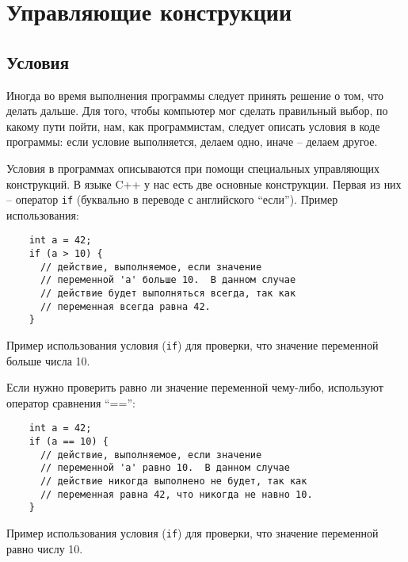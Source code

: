 \documentclass[../sparc.tex]{subfiles}
\begin{document}
\section{Управляющие конструкции}

\subsection{Условия}

Иногда во время выполнения программы следует принять решение о том, что делать
дальше.  Для того, чтобы компьютер мог сделать правильный выбор, по какому пути
пойти, нам, как программистам, следует описать условия в коде программы: если
условие выполняется, делаем одно, иначе -- делаем другое.

Условия в программах описываются при помощи специальных управляющих конструкций.
В языке C++ у нас есть две основные конструкции.  Первая из них -- оператор
\texttt{if} (буквально в переводе с английского ``если'').  Пример
использования:

\begin{listing}[ht]
  \begin{verbatim}
    int a = 42;
    if (a > 10) {
      // действие, выполняемое, если значение
      // переменной 'a' больше 10.  В данном случае
      // действие будет выполняться всегда, так как
      // переменная всегда равна 42.
    }
  \end{verbatim}
  \label{listing:dialogues-with-computer-if-more-than}
  \caption{Пример использования условия (\texttt{if}) для проверки, что значение
    переменной больше числа 10.}
\end{listing}

Если нужно проверить равно ли значение переменной чему-либо, используют оператор
сравнения ``=='':

\begin{listing}[ht]
  \begin{verbatim}
    int a = 42;
    if (a == 10) {
      // действие, выполняемое, если значение
      // переменной 'a' равно 10.  В данном случае
      // действие никогда выполнено не будет, так как
      // переменная равна 42, что никогда не навно 10.
    }
  \end{verbatim}
  \label{listing:dialogues-with-computer-if-equals}
  \caption{Пример использования условия (\texttt{if}) для проверки, что значение
    переменной равно числу 10.}
\end{listing}
\end{document}
